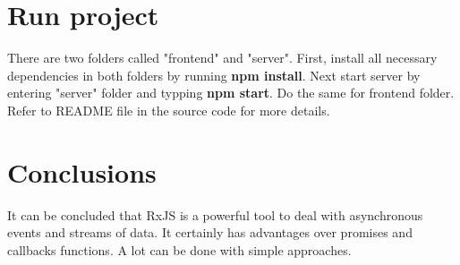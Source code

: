 \documentclass[12pt]{report}
\begin{document}
\section{Run project}
There are two folders called "frontend" and "server". First, install all necessary dependencies in both folders by running \textbf{npm install}. Next start server by entering "server" folder and typping \textbf{npm start}. Do the same for frontend folder. Refer to README file in the source code for more details.

\section{Conclusions}
It can be concluded that RxJS is a powerful tool to deal with asynchronous events and streams of data. It certainly has advantages over promises and callbacks functions. A lot can be done with simple approaches.

\end{document}
